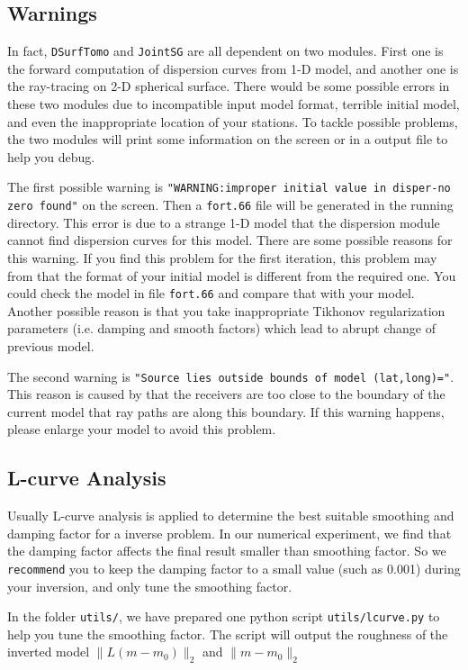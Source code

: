 \documentclass[UTF8]{article}
\begin{document}
\subsection{Warnings}
In fact, \texttt{DSurfTomo} and \texttt{JointSG} are all dependent 
on two modules. First one is the forward computation of dispersion 
curves from 1-D model, and another one is the ray-tracing on 
2-D spherical surface. There would be some possible errors in these 
two modules due to incompatible input model format, terrible initial 
model, and even the inappropriate location of your stations. To tackle possible 
problems, the two modules will print some information on the screen 
or in a output file to help you debug.

The first possible warning is \texttt{"WARNING:improper initial value in 
disper-no zero found"} on the screen. Then a \texttt{fort.66} file will 
be generated in the running directory. This error is due to 
a strange 1-D model that the dispersion module cannot find 
dispersion curves for this model. There are some possible reasons for 
this warning. If you find this problem for the first iteration,
this problem may from that the format of your initial model 
is different from the required one. You could check the model in 
file \texttt{fort.66} and compare that with your model. 
Another possible reason is that you take inappropriate 
Tikhonov regularization parameters (i.e. damping and smooth factors)
which lead to abrupt change of previous model.

The second warning is \texttt{"Source lies outside bounds 
of model (lat,long)="}.
This reason is caused by that the receivers are too close to 
the boundary of the current model that ray paths are along 
this boundary. If this warning happens, please enlarge your 
model to avoid this problem.

\subsection{L-curve Analysis}
Usually L-curve analysis is applied to determine the best 
suitable smoothing and damping factor for a inverse problem. In our 
numerical experiment, we find that the damping factor affects the 
final result smaller than smoothing factor. So we \texttt{recommend}
you to keep the damping factor to a small value (such as 0.001) during 
your inversion, and only tune the smoothing factor. 


In the folder \texttt{utils/}, we have prepared one python script \texttt{utils/lcurve.py} to help 
you tune the smoothing factor. The script will output the roughness of the inverted model $\|L(m-m_0)\|_2$ and $\|m-m_0\|_2$
\end{document}
